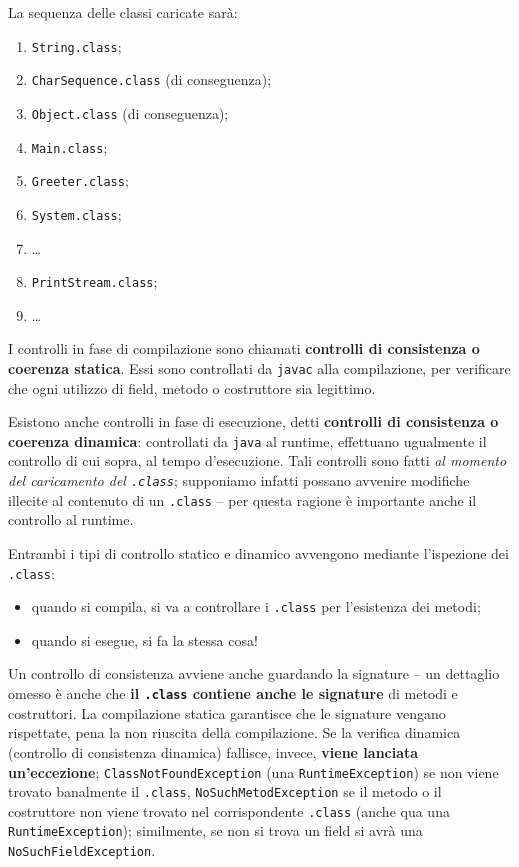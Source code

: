 \documentclass[\fontsizeclass,twocolumn]{\classname}
\theoremstyle{definition}
\theoremstyle{definition}
\begin{document}
La sequenza delle classi caricate sarà:
\begin{enumerate}
    \item \texttt{String.class};
    \item \texttt{CharSequence.class} (di conseguenza);
    \item \texttt{Object.class} (di conseguenza);
    \item \texttt{Main.class};
    \item \texttt{Greeter.class};
    \item \texttt{System.class};
    \item \dots
    \item \texttt{PrintStream.class};
    \item \dots
\end{enumerate}

I controlli in fase di compilazione sono chiamati \textbf{controlli di
consistenza o coerenza statica}. Essi sono controllati da \texttt{javac} alla
compilazione, per verificare che ogni utilizzo di field, metodo o costruttore
sia legittimo.

Esistono anche controlli in fase di esecuzione, detti \textbf{controlli di
consistenza o coerenza dinamica}: controllati da \texttt{java} al runtime,
effettuano ugualmente il controllo di cui sopra, al tempo d'esecuzione. Tali
controlli sono fatti \emph{al momento del caricamento del \texttt{.class}};
supponiamo infatti possano avvenire modifiche illecite al contenuto di un
\texttt{.class} -- per questa ragione è importante anche il controllo al
runtime.

Entrambi i tipi di controllo statico e dinamico avvengono mediante l'ispezione
dei \texttt{.class}:
\begin{itemize}
    \item quando si compila, si va a controllare i \texttt{.class} per
        l'esistenza dei metodi;
    \item quando si esegue, si fa la stessa cosa!
\end{itemize}

Un controllo di consistenza avviene anche guardando la signature -- un
dettaglio omesso è anche che \textbf{il \texttt{.class} contiene anche le
signature} di metodi e costruttori. La compilazione statica garantisce che le
signature vengano rispettate, pena la non riuscita della compilazione. Se la
verifica dinamica (controllo di consistenza dinamica) fallisce, invece,
\textbf{viene lanciata un'eccezione}; \texttt{ClassNotFoundException} (una
\texttt{Runtime\-Exception}) se non viene trovato banalmente il \texttt{.class},
\texttt{NoSuchMetodException} se il metodo o il costruttore non viene trovato
nel corrispondente \texttt{.class} (anche qua una \texttt{Runtime\-Exception});
similmente, se non si trova un field si avrà una \texttt{NoSuchFieldException}.
\end{document}
